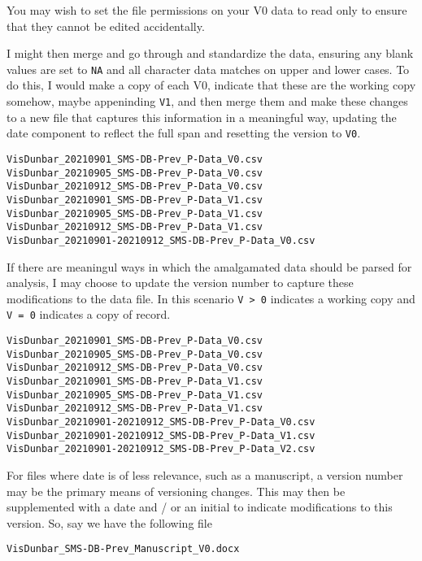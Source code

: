 \documentclass[
]{book}
\begin{document}
You may wish to set the file permissions on your V0 data to read only to ensure that they cannot be edited accidentally.

I might then merge and go through and standardize the data, ensuring any blank values are set to \texttt{NA} and all character data matches on upper and lower cases. To do this, I would make a copy of each V0, indicate that these are the working copy somehow, maybe appeninding \texttt{V1}, and then merge them and make these changes to a new file that captures this information in a meaningful way, updating the date component to reflect the full span and resetting the version to \texttt{V0}.

\begin{verbatim}
VisDunbar_20210901_SMS-DB-Prev_P-Data_V0.csv
VisDunbar_20210905_SMS-DB-Prev_P-Data_V0.csv
VisDunbar_20210912_SMS-DB-Prev_P-Data_V0.csv
VisDunbar_20210901_SMS-DB-Prev_P-Data_V1.csv
VisDunbar_20210905_SMS-DB-Prev_P-Data_V1.csv
VisDunbar_20210912_SMS-DB-Prev_P-Data_V1.csv
VisDunbar_20210901-20210912_SMS-DB-Prev_P-Data_V0.csv
\end{verbatim}

If there are meaningul ways in which the amalgamated data should be parsed for analysis, I may choose to update the version number to capture these modifications to the data file. In this scenario \texttt{V\ \textgreater{}\ 0} indicates a working copy and \texttt{V\ =\ 0} indicates a copy of record.

\begin{verbatim}
VisDunbar_20210901_SMS-DB-Prev_P-Data_V0.csv
VisDunbar_20210905_SMS-DB-Prev_P-Data_V0.csv
VisDunbar_20210912_SMS-DB-Prev_P-Data_V0.csv
VisDunbar_20210901_SMS-DB-Prev_P-Data_V1.csv
VisDunbar_20210905_SMS-DB-Prev_P-Data_V1.csv
VisDunbar_20210912_SMS-DB-Prev_P-Data_V1.csv
VisDunbar_20210901-20210912_SMS-DB-Prev_P-Data_V0.csv
VisDunbar_20210901-20210912_SMS-DB-Prev_P-Data_V1.csv
VisDunbar_20210901-20210912_SMS-DB-Prev_P-Data_V2.csv
\end{verbatim}

For files where date is of less relevance, such as a manuscript, a version number may be the primary means of versioning changes. This may then be supplemented with a date and / or an initial to indicate modifications to this version. So, say we have the following file

\begin{verbatim}
VisDunbar_SMS-DB-Prev_Manuscript_V0.docx
\end{verbatim}
\end{document}
